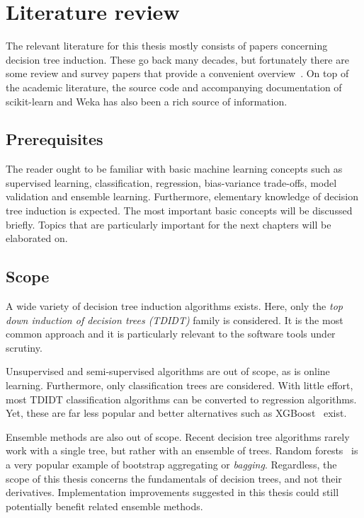 \chapter{Literature review}\label{cha:literature}
The relevant literature for this thesis mostly consists of papers concerning decision tree induction. These go back many decades, but fortunately there are some review and survey papers that provide a convenient overview~\cite{murthy1998automatic, rokach2005top, kotsiantis2007supervised}. On top of the academic literature, the source code and accompanying documentation of scikit-learn and Weka has also been a rich source of information.

\section{Prerequisites}
The reader ought to be familiar with basic machine learning concepts such as supervised learning, classification, regression, bias-variance trade-offs, model validation and ensemble learning. Furthermore, elementary knowledge of decision tree induction is expected. The most important basic concepts will be discussed briefly. Topics that are particularly important for the next chapters will be elaborated on.

\section{Scope}
A wide variety of decision tree induction algorithms exists. Here, only the \emph{top down induction of decision trees (TDIDT)} family is considered. It is the most common approach and it is particularly relevant to the software tools under scrutiny.

Unsupervised and semi-supervised algorithms are out of scope, as is online learning. Furthermore, only classification trees are considered. With little effort, most TDIDT classification algorithms can be converted to regression algorithms. Yet, these are far less popular and better alternatives such as XGBoost~\cite{xgboost} exist.

Ensemble methods are also out of scope. Recent decision tree algorithms rarely work with a single tree, but rather with an ensemble of trees. Random forests~\cite{rf} is a very popular example of bootstrap aggregating or \emph{bagging}. Regardless, the scope of this thesis concerns the fundamentals of decision trees, and not their derivatives. Implementation improvements suggested in this thesis could still potentially benefit related ensemble methods.

